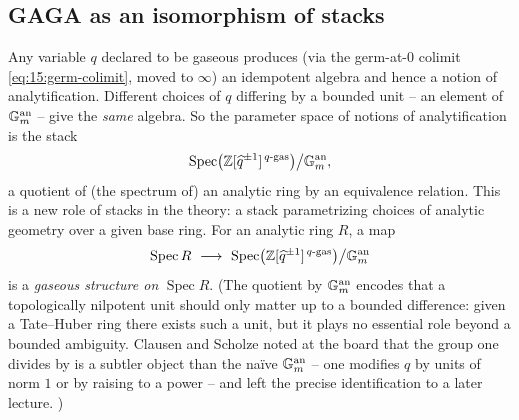 \subsection{GAGA as an isomorphism of stacks}

\begin{remark}
\label{rmk:15:analytification-stack}
Any variable $q$ declared to be gaseous produces (via the germ-at-$0$ colimit
\eqref{eq:15:germ-colimit}, moved to $\infty$) an idempotent algebra and hence a
notion of analytification. Different choices of $q$ differing by a bounded unit --
an element of $\mathbb{G}_{m}^{\mathrm{an}}$ -- give the \emph{same} algebra. So the parameter
space of notions of analytification is the stack
\begin{equation}
\label{eq:15:analytification-stack}
\operatorname{Spec}\bigl(\mathbb{Z}[\widehat q^{\pm1}]^{\,q\text{-}\mathrm{gas}}\bigr)\big/\mathbb{G}_{m}^{\mathrm{an}},
\end{equation}
a quotient of (the spectrum of) an analytic ring by an equivalence relation. This is a
new role of stacks in the theory: a stack parametrizing choices of analytic geometry
over a given base ring. For an analytic ring $R$, a map
\begin{equation}
\label{eq:15:gaseous-structure-map}
\operatorname{Spec} R\ \longrightarrow\ \operatorname{Spec}\bigl(\mathbb{Z}[\widehat q^{\pm1}]^{\,q\text{-}\mathrm{gas}}\bigr)\big/\Gm^{\mathrm{an}}
\end{equation}
is a \emph{gaseous structure on} $\operatorname{Spec} R$. (The quotient by
$\mathbb{G}_{m}^{\mathrm{an}}$ encodes that a topologically nilpotent unit should only matter up
to a bounded difference: given a Tate--Huber ring there exists such a unit, but it
plays no essential role beyond a bounded ambiguity. Clausen and Scholze noted at the
board that the group one divides by is a subtler object than the na\"ive
$\mathbb{G}_{m}^{\mathrm{an}}$ -- one modifies $q$ by units of norm $1$ or by raising to a power
-- and left the precise identification to a later lecture.
)
\end{remark}

